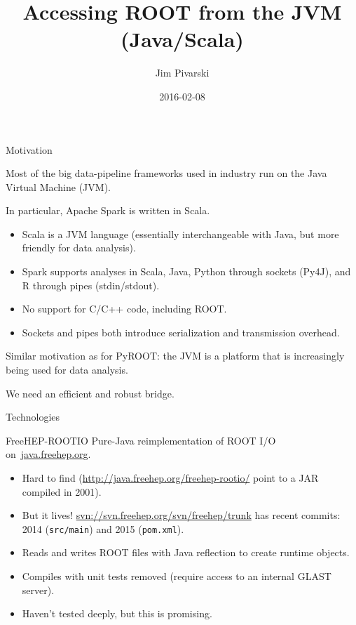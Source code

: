 \documentclass{beamer}
\title[2016-02-08-ROOT-JVM-firsttalk]{Accessing ROOT from the JVM (Java/Scala)}
\author{Jim Pivarski}
\date{2016-02-08}
\begin{document}
\begin{frame}
  \titlepage
\end{frame}


\begin{frame}{Motivation}
\begin{block}{}
Most of the big data-pipeline frameworks used in industry run on the Java Virtual Machine (JVM).
\end{block}

\begin{block}{}
\vspace{-\baselineskip}
In particular, Apache Spark is written in Scala.
\begin{itemize}
\item Scala is a JVM language (essentially interchangeable with Java, but more friendly for data analysis).
\item Spark supports analyses in Scala, Java, Python through sockets (Py4J), and R through pipes (stdin/stdout).
\item No support for C/C++ code, including ROOT.
\item Sockets and pipes both introduce serialization and transmission overhead.
\end{itemize}
\end{block}

\begin{block}{}
\vspace{-\baselineskip}
Similar motivation as for PyROOT: the JVM is a platform that is increasingly being used for data analysis.

\vspace{0.5\baselineskip}
We need an efficient and robust bridge.
\end{block}
\end{frame}

\begin{frame}{Technologies}

\begin{block}{FreeHEP-ROOTIO}
Pure-Java reimplementation of ROOT I/O \mbox{on \url{java.freehep.org}.\hspace{-1 cm}}
\begin{itemize}
\item Hard to find (\href{docs}{http://java.freehep.org/freehep-rootio/} point to a JAR compiled in 2001).
\item But it lives! \url{svn://svn.freehep.org/svn/freehep/trunk} has recent commits: 2014 ({\tt src/main}) and 2015 ({\tt pom.xml}).
\item Reads and writes ROOT files with Java reflection to create runtime objects.
\item Compiles with unit tests removed (require access to an internal GLAST server).
\item Haven't tested deeply, but this is promising.
\end{itemize}
\end{block}
\end{frame}
\end{document}
